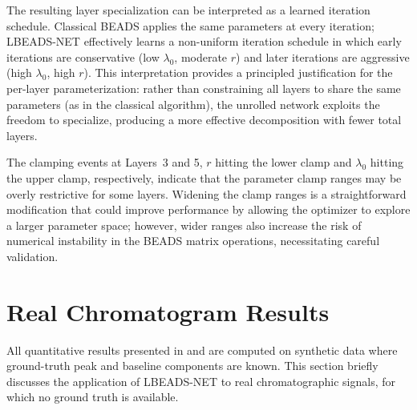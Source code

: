 The resulting layer specialization can be interpreted as a learned iteration schedule. Classical BEADS applies the same parameters at every iteration; LBEADS-NET effectively learns a non-uniform iteration schedule in which early iterations are conservative (low $\lambda_0$, moderate $r$) and later iterations are aggressive (high $\lambda_0$, high $r$). This interpretation provides a principled justification for the per-layer parameterization: rather than constraining all layers to share the same parameters (as in the classical algorithm), the unrolled network exploits the freedom to specialize, producing a more effective decomposition with fewer total layers.

The clamping events at Layers~3 and 5, $r$ hitting the lower clamp and $\lambda_0$ hitting the upper clamp, respectively, indicate that the parameter clamp ranges may be overly restrictive for some layers. Widening the clamp ranges is a straightforward modification that could improve performance by allowing the optimizer to explore a larger parameter space; however, wider ranges also increase the risk of numerical instability in the BEADS matrix operations, necessitating careful validation.



\section{Real Chromatogram Results}
\label{sec:results_real}

All quantitative results presented in  and  are computed on synthetic data where ground-truth peak and baseline components are known. This section briefly discusses the application of LBEADS-NET to real chromatographic signals, for which no ground truth is available.

